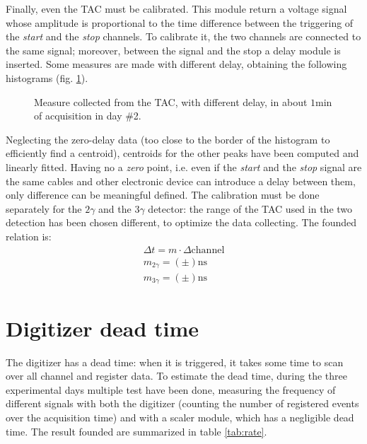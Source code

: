 \documentclass[11pt,a4 paper]{article}
\begin{document}
Finally, even the TAC must be calibrated. This module return a voltage signal whose amplitude is proportional to the time difference between the triggering of the \emph{start} and the \emph{stop} channels. To calibrate it, the two channels are connected to the same signal; moreover, between the signal and the stop a delay module is inserted. Some measures are made with different delay, obtaining the following histograms (fig. \ref{fig:tachisto}).

\begin{figure}[H]
    \centering
    \caption{Measure collected from the TAC, with different delay, in about $1\si{\minute}$ of acquisition in day \#2.}
    \label{fig:tachisto}
\end{figure}

Neglecting the zero-delay data (too close to the border of the histogram to efficiently find a centroid), centroids for the other peaks have been computed and linearly fitted. Having no a \emph{zero} point, i.e. even if the \emph{start} and the \emph{stop} signal are the same cables and other electronic device can introduce a delay between them, only difference can be meaningful defined. The calibration must be done separately for the $2\gamma$ and the $3\gamma$ detector: the range of the TAC used in the two detection has been chosen different, to optimize the data collecting. The founded relation is:
\begin{gather*}
    \Delta t = m \cdot \Delta\text{channel} \\
    m_{2\gamma} = ( \pm )\si{\nano\second} \\
    m_{3\gamma} = ( \pm )\si{\nano\second}
\end{gather*}

\section{Digitizer dead time}
The digitizer has a dead time: when it is triggered, it takes some time to scan over all channel and register data. To estimate the dead time, during the three experimental days multiple test have been done, measuring the frequency of different signals with both the digitizer (counting the number of registered events over the acquisition time) and with a scaler module, which has a negligible dead time. The result founded are summarized in table \ref{tab:rate}.
\end{document}
